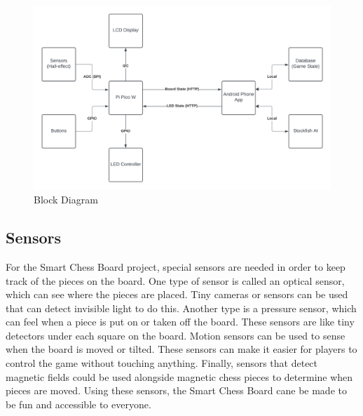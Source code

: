 \documentclass[11pt,journal]{IEEEtran}
\begin{document}
\begin{figure}[h]
  \includegraphics[width=\linewidth]{Chess Board Capstone Block Diagram}
  \caption{Block Diagram}
  \label{blockdiag}
\end{figure}


\subsection{Sensors}

For the Smart Chess Board project, special sensors are needed in order to keep track of the pieces on the board. One type of sensor is called an optical sensor, which can see where the pieces are placed. Tiny cameras or sensors can be used that can detect invisible light to do this. Another type is a pressure sensor, which can feel when a piece is put on or taken off the board. These sensors are like tiny detectors under each square on the board. Motion sensors can be used to sense when the board is moved or tilted. These sensors can make it easier for players to control the game without touching anything. Finally, sensors that detect magnetic fields could be used alongside magnetic chess pieces to determine when pieces are moved. Using these sensors, the Smart Chess Board cane be made to be fun and accessible to everyone.
\end{document}
